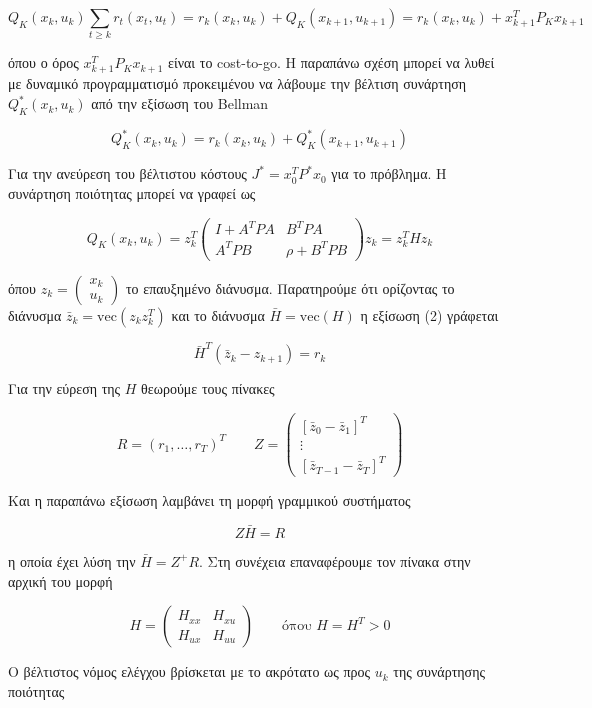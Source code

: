 \documentclass[a4paper,oneside,12pt]{article}
\begin{document}
\begin{equation}
Q_K(x_k, u_k) \sum_{t \ge k} r_t(x_t, u_t) = r_k(x_k, u_k) + Q_K(x_{k+1}, u_{k+1}) = r_k(x_k, u_k) + x_{k+1}^TP_Kx_{k+1}
\end{equation}

όπου ο όρος $x_{k+1}^T P_K x_{k+1}$ είναι το cost-to-go. Η παραπάνω σχέση μπορεί να λυθεί με δυναμικό προγραμματισμό προκειμένου να λάβουμε την βέλτιση συνάρτηση $Q^*_K(x_k, u_k)$ από την εξίσωση του Bellman

$$Q_K^*(x_k, u_k) = r_k(x_k, u_k) + Q^*_K(x_{k+1}, u_{k+1})$$

Για την ανεύρεση του βέλτιστου κόστους $J^* = x_0^TP^*x_0$ για το πρόβλημα. Η συνάρτηση ποιότητας μπορεί να γραφεί ως

$$Q_K(x_k, u_k) = z_k^T\begin{pmatrix}
	I + A^TPA & B^T P A \\
	A^TPB & \rho + B^T P B 
\end{pmatrix}z_k = z_k^T H z_k$$

όπου $z_k = \begin{pmatrix} x_k \\ u_k \end{pmatrix}$ το επαυξημένο διάνυσμα. Παρατηρούμε ότι ορίζοντας το διάνυσμα $\bar z_k = \mathrm {vec} (z_k z_k^T)$ και το διάνυσμα $\bar H = \mathrm{vec} (H)$ η εξίσωση (2) γράφεται

$$\bar H^T (\bar z_k - z_{k+1}) = r_k$$

Για την εύρεση της $H$ θεωρούμε τους πίνακες 

$$R = (r_1, \dots, r_T)^T \qquad 
Z = \begin{pmatrix}
	[\bar z_0 - \bar z_1]^T \\
	\vdots \\
	[\bar z_{T-1} - \bar z_T]^T
\end{pmatrix}$$ 

Και η παραπάνω εξίσωση λαμβάνει τη μορφή γραμμικού συστήματος

$$Z \bar H = R$$

η οποία έχει λύση την $\bar H = Z^+ R$. Στη συνέχεια επαναφέρουμε τον πίνακα στην αρχική του μορφή 

$$H = \begin{pmatrix}
	H_{xx} & H_{xu} \\
	H_{ux} & H_{uu}
\end{pmatrix} \qquad \text{όπου } H = H^T > 0$$

Ο βέλτιστος νόμος ελέγχου βρίσκεται με το ακρότατο ως προς $u_k$ της συνάρτησης ποιότητας 
\end{document}
